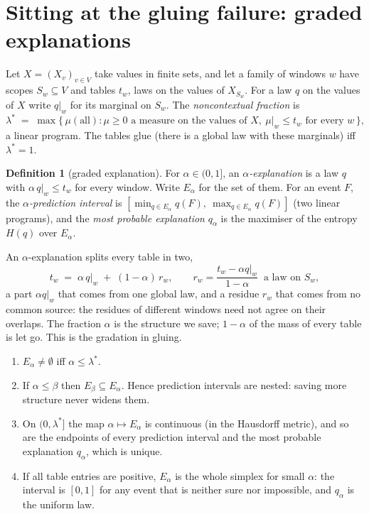 \documentclass[11pt]{article}
\theoremstyle{definition}\newtheorem{definition}[theorem]{Definition}\newtheorem{remark}[theorem]{Remark}\newtheorem{example}[theorem]{Example}
\begin{document}
\section{Sitting at the gluing failure: graded explanations}\label{sec:graded}

Let $X=(X_v)_{v\in V}$ take values in finite sets, and let a family of windows $w$ have scopes $S_w\subseteq V$ and tables $t_w$, laws on
the values of $X_{S_w}$. For a law $q$ on the values of $X$ write $q|_w$ for its marginal on $S_w$. The \emph{noncontextual fraction}
\cite{AbramskyBarbosaMansfield2017} is
\[
  \lambda^* \;=\; \max\{\,\mu(\text{all}) : \mu\ge 0 \text{ a measure on the values of } X,\ \mu|_w\le t_w \text{ for every } w\,\},
\]
a linear program. The tables glue (there is a global law with these marginals) iff $\lambda^*=1$.

\begin{definition}[graded explanation]
For $\alpha\in(0,1]$, an \emph{$\alpha$-explanation} is a law $q$ with $\alpha\, q|_w\le t_w$ for every window. Write $E_\alpha$ for the
set of them. For an event $F$, the \emph{$\alpha$-prediction interval} is $[\min_{q\in E_\alpha} q(F),\ \max_{q\in E_\alpha}q(F)]$
(two linear programs), and the \emph{most probable explanation} $q_\alpha$ is the maximiser of the entropy $H(q)$ over $E_\alpha$.
\end{definition}

An $\alpha$-explanation splits every table in two,
\begin{equation}\label{eq:split}
  t_w \;=\; \alpha\, q|_w \;+\; (1-\alpha)\, r_w, \qquad r_w=\frac{t_w-\alpha q|_w}{1-\alpha}\ \text{ a law on } S_w ,
\end{equation}
a part $\alpha q|_w$ that comes from one global law, and a residue $r_w$ that comes from no common source: the residues of different windows
need not agree on their overlaps. The fraction $\alpha$ is the structure we save; $1-\alpha$ of the mass of every table is let go. This is
the gradation in gluing.

\begin{proposition}\label{prop:graded}
\begin{enumerate}[label=(\roman*),leftmargin=*,itemsep=1pt]
\item $E_\alpha\neq\emptyset$ iff $\alpha\le\lambda^*$.
\item If $\alpha\le\beta$ then $E_\beta\subseteq E_\alpha$. Hence prediction intervals are nested: saving more structure never widens
them.
\item On $(0,\lambda^*]$ the map $\alpha\mapsto E_\alpha$ is continuous (in the Hausdorff metric), and so are the endpoints of every
prediction interval and the most probable explanation $q_\alpha$, which is unique.
\item If all table entries are positive, $E_\alpha$ is the whole simplex for small $\alpha$: the interval is $[0,1]$ for any event that is
neither sure nor impossible, and $q_\alpha$ is the uniform law.
\end{enumerate}
\end{proposition}
\end{document}
